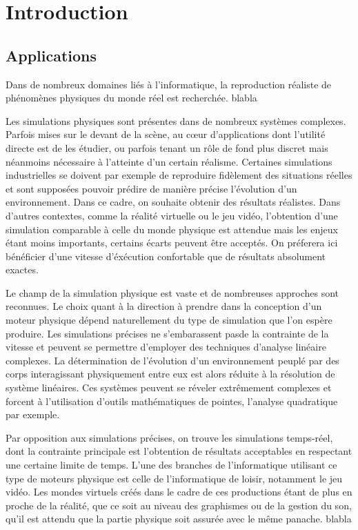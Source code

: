 \section{Introduction}

\subsection{Applications}

Dans de nombreux domaines liés à l'informatique, la reproduction réaliste de phénomènes physiques du monde réel est recherchée. blabla

Les simulations physiques sont présentes dans de nombreux systèmes complexes. Parfois mises sur le devant de la scène, au c\oe ur d'applications dont l'utilité directe est de les étudier, ou parfois tenant un rôle de fond plus discret mais néanmoins nécessaire à l'atteinte d'un certain réalisme. Certaines simulations industrielles se doivent par exemple de reproduire fidèlement des situations réelles et sont supposées pouvoir prédire de manière précise l'évolution d'un environnement. Dans ce cadre, on souhaite obtenir des résultats réalistes. Dans d'autres contextes, comme la réalité virtuelle ou le jeu vidéo, l'obtention d'une simulation comparable à celle du monde physique est attendue mais les enjeux étant moins importants, certains écarts peuvent être acceptés. On préferera ici bénéficier d'une vitesse d'éxécution confortable que de résultats absolument exactes.

Le champ de la simulation physique est vaste et de nombreuses approches sont reconnues. Le choix quant à la direction à prendre dans la conception d'un moteur physique dépend naturellement du type de simulation que l'on espère produire. Les simulations précises ne s'embarassent pasde la contrainte de la vitesse et peuvent se permettre d'employer des techniques d'analyse linéaire complexes. La détermination de l'évolution d'un environnement peuplé par des corps interagissant physiquement entre eux est alors réduite à la résolution de système linéaires. Ces systèmes peuvent se réveler extrêmement complexes et forcent à l'utilisation d'outils mathématiques de pointes, l'analyse quadratique par exemple.

Par opposition aux simulations précises, on trouve les simulations temps-réel, dont la contrainte principale est l'obtention de résultats acceptables en respectant une certaine limite de temps. L'une des branches de l'informatique utilisant ce type de moteurs physique est celle de l'informatique de loisir, notamment le jeu vidéo. Les mondes virtuels créés dans le cadre de ces productions étant de plus en proche de la réalité, que ce soit au niveau des graphismes ou de la gestion du son, qu'il est attendu que la partie physique soit assurée avec le même panache. blabla

